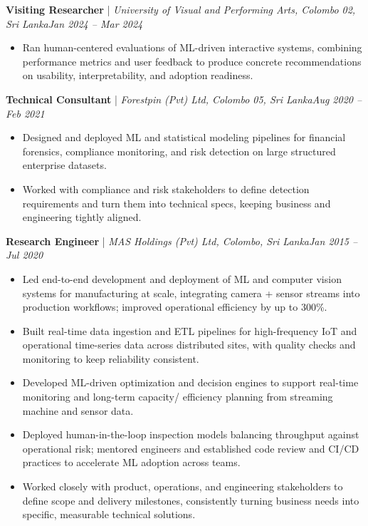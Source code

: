 \documentclass[11pt]{article}
\newenvironment{cvrole}[5]{%
  \par\noindent\textbf{\large #1} | \textit{\small #2, #3}\hfill \textit{\small #4 -- #5}\par
  \begin{itemize}[leftmargin=2em, itemsep=-0.3em, topsep=-0.5em]%
}{%
  \end{itemize}\par\noindent\mbox{}\par\vspace{0.1em}%
}
\begin{document}
\begin{cvrole}{Visiting Researcher}{University of Visual and Performing Arts}{Colombo 02, Sri Lanka}{Jan 2024}{Mar 2024}
    \item Ran human-centered evaluations of ML-driven interactive systems, combining performance metrics and user feedback to produce concrete recommendations on usability, interpretability, and adoption readiness.
\end{cvrole}

\begin{cvrole}{Technical Consultant}{Forestpin (Pvt) Ltd}{Colombo 05, Sri Lanka}{Aug 2020}{Feb 2021}
    \item Designed and deployed ML and statistical modeling pipelines for financial forensics, compliance monitoring, and risk detection on large structured enterprise datasets.
    \item Worked with compliance and risk stakeholders to define detection requirements and turn them into technical specs, keeping business and engineering tightly aligned.
\end{cvrole}

\begin{cvrole}{Research Engineer}{MAS Holdings (Pvt) Ltd}{Colombo, Sri Lanka}{Jan 2015}{Jul 2020}
    \item Led end-to-end development and deployment of ML and computer vision systems for manufacturing at scale, integrating camera + sensor streams into production workflows; improved operational efficiency by up to {300\%}.
    \item Built real-time data ingestion and ETL pipelines for high-frequency IoT and operational time-series data across distributed sites, with quality checks and monitoring to keep reliability consistent.
    \item Developed ML-driven optimization and decision engines to support real-time monitoring and long-term capacity/ efficiency planning from streaming machine and sensor data.
    \item Deployed human-in-the-loop inspection models balancing throughput against operational risk; mentored engineers and established code review and CI/CD practices to accelerate ML adoption across teams.
    \item Worked closely with product, operations, and engineering stakeholders to define scope and delivery milestones, consistently turning business needs into specific, measurable technical solutions.
\end{cvrole}
\end{document}
